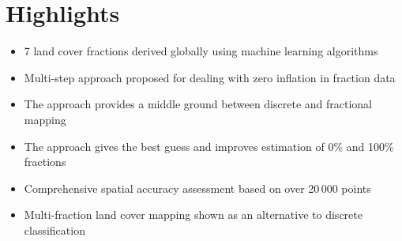 \documentclass[review,authoryear,3p]{elsarticle}
\begin{document}
\section*{Highlights}
\begin{itemize}
    \item 7 land cover fractions derived globally using machine learning algorithms
    \item Multi-step approach proposed for dealing with zero inflation in fraction data
    \item The approach provides a middle ground between discrete and fractional mapping
    \item The approach gives the best guess and improves estimation of 0\% and 100\% fractions
    \item Comprehensive spatial accuracy assessment based on over 20\,000 points
    \item Multi-fraction land cover mapping shown as an alternative to discrete classification
\end{itemize}
\end{document}
